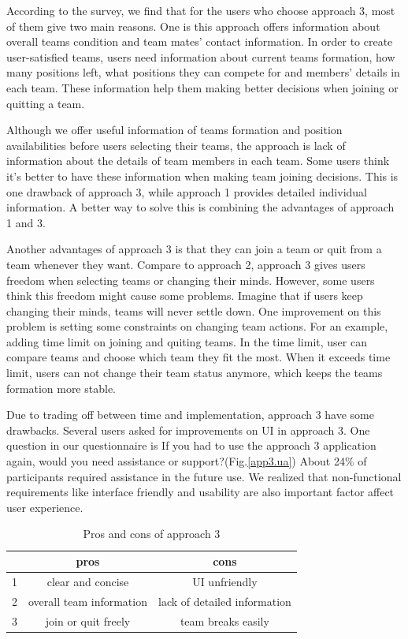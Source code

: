 \documentclass[conference]{IEEEtran}
\begin{document}
According to the survey, we find that for the users who choose approach 3, most of them give two main reasons. One is this approach offers information about overall teams condition and team mates' contact information. In order to create user-satisfied teams, users need information about current teams formation, how many positions left, what positions they can compete for and members' details in each team. These information help them making better decisions when joining or quitting a team. 

Although we offer useful information of teams formation and position availabilities before users selecting their teams, the approach is lack of information about the details of team members in each team. Some users think it's better to have these information when making team joining decisions. This is one drawback of approach 3, while approach 1 provides detailed individual information. A better way to solve this is combining the advantages of approach 1 and 3.

Another advantages of approach 3 is that they can join a team or quit from a team whenever they want. Compare to approach 2, approach 3 gives users freedom when selecting teams or changing their minds. However, some users think this freedom might cause some problems. Imagine that if users keep changing their minds, teams will never settle down. One improvement on this problem is setting some constraints on changing team actions. For an example, adding time limit on joining and quiting teams. In the time limit, user can compare teams and choose which team they fit the most. When it exceeds time limit, users can not change their team status anymore, which keeps the teams formation more stable.

Due to trading off between time and implementation, approach 3 have some drawbacks. Several users asked for improvements on UI in approach 3. One question in our questionnaire is If you had to use the approach 3 application again, would you need assistance or support?(Fig.\ref{app3.ua}) About 24\% of participants required assistance in the future use. We realized that non-functional requirements like interface friendly and usability are also important factor affect user experience.

 \begin{table}[!htb]\centering
 \begin{tabular} { | c | c |  c |}
 \hline
&pros & cons\\
 \hline
1& clear and concise & UI unfriendly\\
 \hline
2& overall team information & lack of detailed information\\
 \hline
3&join or quit freely & team breaks easily\\
 \hline
 \end{tabular}
 \caption{Pros and cons of approach 3}
 \end{table}
\end{document}
